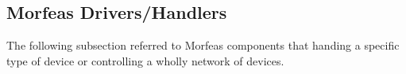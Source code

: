 \subsection{Morfeas Drivers/Handlers}
The following subsection referred to Morfeas components that handing a specific type of device or controlling a wholly network of devices.


